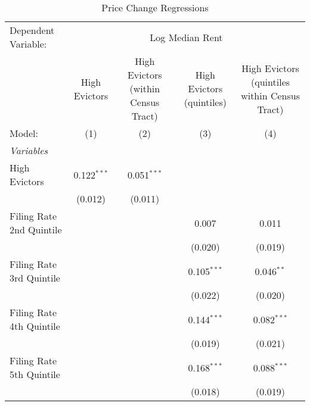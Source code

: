 \begin{table}[htbp]
   \caption{Price Change Regressions}
   \centering
   \begin{tabular}{lcccc}
      \tabularnewline \midrule \midrule
      Dependent Variable: & \multicolumn{4}{c}{Log Median Rent}\\
                                                  & High Evictors  & High Evictors (within Census Tract) & High Evictors (quintiles) & High Evictors (quintiles within Census Tract) \\   
      Model:                                      & (1)            & (2)                                 & (3)                       & (4)\\  
      \midrule
      \emph{Variables}\\
      High Evictors                               & 0.122$^{***}$  & 0.051$^{***}$                       &                           &   \\   
                                                  & (0.012)        & (0.011)                             &                           &   \\   
      Filing Rate 2nd Quintile                    &                &                                     & 0.007                     & 0.011\\   
                                                  &                &                                     & (0.020)                   & (0.019)\\   
      Filing Rate 3rd Quintile                    &                &                                     & 0.105$^{***}$             & 0.046$^{**}$\\   
                                                  &                &                                     & (0.022)                   & (0.020)\\   
      Filing Rate 4th Quintile                    &                &                                     & 0.144$^{***}$             & 0.082$^{***}$\\   
                                                  &                &                                     & (0.019)                   & (0.021)\\   
      Filing Rate 5th Quintile                    &                &                                     & 0.168$^{***}$             & 0.088$^{***}$\\   
                                                  &                &                                     & (0.018)                   & (0.019)\\   

\end{tabular}
\end{table}
